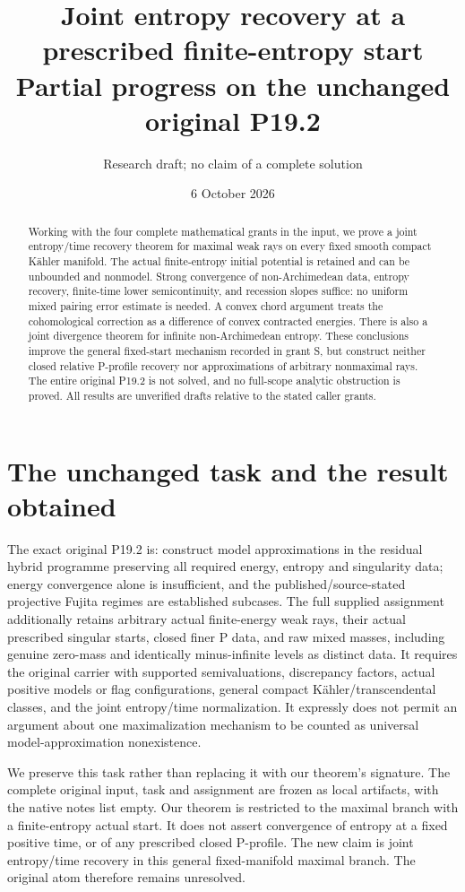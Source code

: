 \documentclass[11pt]{article}
\title{Joint entropy recovery at a prescribed finite-entropy start\\
\large Partial progress on the unchanged original P19.2}
\author{Research draft; no claim of a complete solution}
\date{6 October 2026}
\begin{document}
\maketitle
\begin{abstract}
Working with the four complete mathematical grants in the input, we
prove a joint entropy/time recovery theorem for maximal weak rays on
every fixed smooth compact K\"ahler manifold. The actual finite-entropy
initial potential is retained and can be unbounded and nonmodel.
Strong convergence of non-Archimedean data, entropy recovery, finite-time
lower semicontinuity, and recession slopes suffice: no uniform mixed
pairing error estimate is needed. A convex chord argument treats the
cohomological correction as a difference of convex contracted energies.
There is also a joint divergence theorem for infinite non-Archimedean
entropy. These conclusions improve the general fixed-start mechanism
recorded in grant S, but construct neither closed relative P-profile
recovery nor approximations of arbitrary nonmaximal rays. The entire
original P19.2 is not solved, and no full-scope analytic obstruction
is proved. All results are unverified drafts relative to the stated
caller grants.
\end{abstract}

\section{The unchanged task and the result obtained}
The exact original P19.2 is: construct model approximations in the
residual hybrid programme preserving all required energy, entropy and
singularity data; energy convergence alone is insufficient, and the
published/source-stated projective Fujita regimes are established
subcases. The full supplied assignment additionally retains arbitrary
actual finite-energy weak rays, their actual prescribed singular starts,
closed finer P data, and raw mixed masses, including genuine zero-mass
and identically minus-infinite levels as distinct data. It requires
the original carrier with supported semivaluations, discrepancy factors,
actual positive models or flag configurations, general compact
K\"ahler/transcendental classes, and the joint entropy/time normalization.
It expressly does not permit an argument about one maximalization
mechanism to be counted as universal model-approximation nonexistence.

We preserve this task rather than replacing it with our theorem's
signature. The complete original input, task and assignment are frozen
as local artifacts, with the native notes list empty. Our theorem is
restricted to the maximal branch with a finite-entropy actual start.
It does not assert convergence of entropy at a fixed positive time,
or of any prescribed closed P-profile. The new claim is joint
entropy/time recovery in this general fixed-manifold maximal branch.
The original atom therefore remains unresolved.
\end{document}
